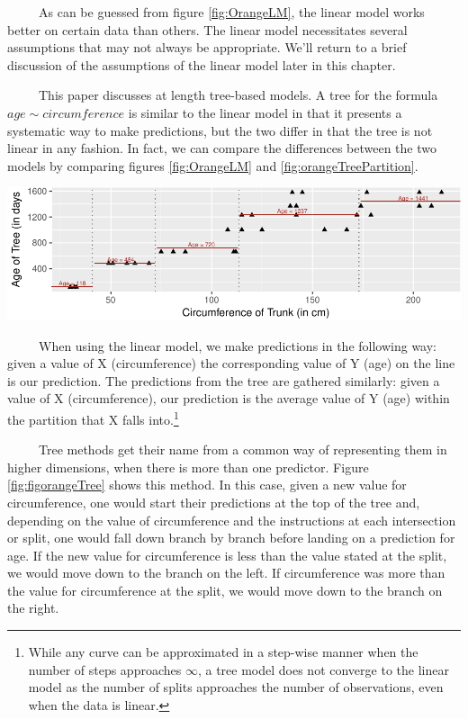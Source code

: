 \documentclass[12pt,twoside]{reedthesis}
\let\origfigure\figure
\let\endorigfigure\endfigure
\renewenvironment{figure}[1][2] {
    \expandafter\origfigure\expandafter[H]
} {
    \endorigfigure
}
\begin{document}
  ~~~~~As can be guessed from figure \ref{fig:OrangeLM}, the linear model
  works better on certain data than others. The linear model necessitates
  several assumptions that may not always be appropriate. We'll return to
  a brief discussion of the assumptions of the linear model later in this
  chapter.
  
  ~~~~~This paper discusses at length tree-based models. A tree for the
  formula \(age \sim circumference\) is similar to the linear model in
  that it presents a systematic way to make predictions, but the two
  differ in that the tree is not linear in any fashion. In fact, we can
  compare the differences between the two models by comparing figures
  \ref{fig:OrangeLM} and \ref{fig:orangeTreePartition}.
  
  \begin{figure}[H]
  
  {\centering \includegraphics{Thesis_files/figure-latex/unnamed-chunk-6-1} 
  
  }
  
  \caption{\label{fig:orangeTreePartition}A tree modeling the formula age \(\sim\)  trunk circumference first creates partitions on the predictor, seen as vertical lines, and then predicts the value of the response within that partition, seen as text.}\label{fig:unnamed-chunk-6}
  \end{figure}
  
  ~~~~~When using the linear model, we make predictions in the following
  way: given a value of X (circumference) the corresponding value of Y
  (age) on the line is our prediction. The predictions from the tree are
  gathered similarly: given a value of X (circumference), our prediction
  is the average value of Y (age) within the partition that X falls
  into.\footnote{While any curve can be approximated in a step-wise manner
    when the number of steps approaches \(\infty\), a tree model does not
    converge to the linear model as the number of splits approaches the
    number of observations, even when the data is linear.}
  
  ~~~~~Tree methods get their name from a common way of representing them
  in higher dimensions, when there is more than one predictor. Figure
  \ref{fig:figorangeTree} shows this method. In this case, given a new
  value for circumference, one would start their predictions at the top of
  the tree and, depending on the value of circumference and the
  instructions at each intersection or split, one would fall down branch
  by branch before landing on a prediction for age. If the new value for
  circumference is less than the value stated at the split, we would move
  down to the branch on the left. If circumference was more than the value
  for circumference at the split, we would move down to the branch on the
  right.
  
\end{document}
